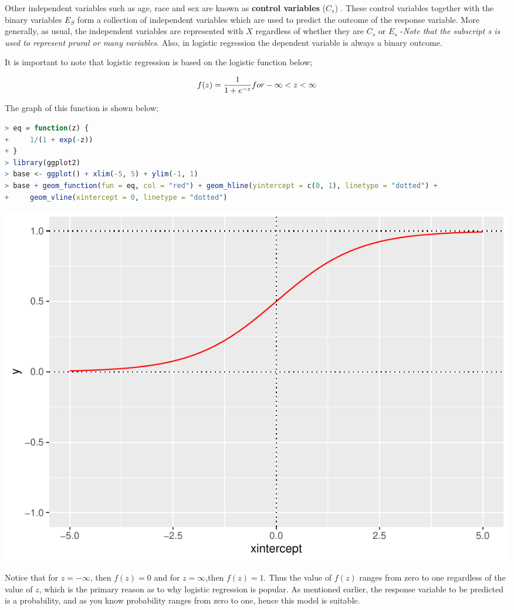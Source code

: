 \documentclass[
]{article}
\begin{document}
Other independent variables such as age, race and sex are known as
\textbf{control variables} (\(C_s\)) . These control variables together
with the binary variables \(E_S\) form a collection of independent
variables which are used to predict the outcome of the response
variable. More generally, as usual, the independent variables are
represented with \(X\) regardless of whether they are \(C_s\) or \(E_s\)
-\emph{Note that the subscript s is used to represent prural or many
variables}. Also, in logistic regression the dependent variable is
always a binary outcome.

It is important to note that logistic regression is based on the
logistic function below;

\[f(z)=\frac{1}{1+e^{-z}}\space\space for\space\space -\infty<z<\infty \]

The graph of this function is shown below;

\begin{lstlisting}[language=R]
> eq = function(z) {
+     1/(1 + exp(-z))
+ }
> library(ggplot2)
> base <- ggplot() + xlim(-5, 5) + ylim(-1, 1)
> base + geom_function(fun = eq, col = "red") + geom_hline(yintercept = c(0, 1), linetype = "dotted") +
+     geom_vline(xintercept = 0, linetype = "dotted")
\end{lstlisting}

\includegraphics{Types-of-Regressions_files/figure-latex/unnamed-chunk-28-1.pdf}

Notice that for \(z=-\infty\), then \(f(z)=0\) and for \(z=\infty\),then
\(f(z)=1\). Thus the value of \(f(z)\) ranges from zero to one
regardless of the value of \(z\), which is the primary reason as to why
logistic regression is popular. As mentioned earlier, the response
variable to be predicted is a probability, and as you know probability
ranges from zero to one, hence this model is suitable.
\end{document}

